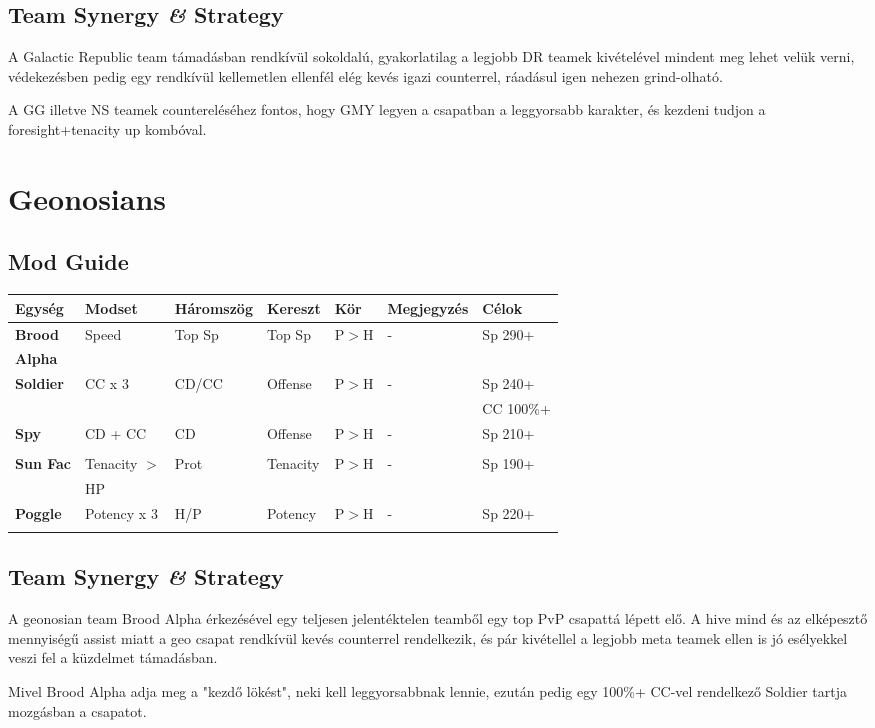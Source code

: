 \documentclass[11pt]{report}
\begin{document}
\section{Team Synergy \textit{\&} Strategy}
A Galactic Republic team támadásban rendkívül sokoldalú, gyakorlatilag a legjobb DR teamek kivételével mindent meg lehet velük verni, védekezésben pedig egy rendkívül kellemetlen ellenfél elég kevés igazi counterrel, ráadásul igen nehezen grind-olható.\par
A GG illetve NS teamek countereléséhez fontos, hogy GMY legyen a csapatban a leggyorsabb karakter, és kezdeni tudjon a foresight+tenacity up kombóval.


\chapter{Geonosians}
\section{Mod Guide}
\begin{center}
    \begin{tabular}{|l | l | l | l | l | l | l |}
        \hline
        Egység & Modset & Háromszög & Kereszt & Kör & Megjegyzés & Célok\\ \hline
        \textbf{Brood} & Speed & Top Sp & Top Sp & P$>$H & - & Sp 290+\\
        \textbf{Alpha} &  &  &  &  &  & \\ \hline
        \textbf{Soldier} & CC x 3 & CD/CC & Offense & P$>$H & - & Sp 240+\\
        &  &  &  &  &  & CC 100\%+\\ \hline
        \textbf{Spy} & CD + CC & CD & Offense & P$>$H & - & Sp 210+\\
        &  &  &  &  &  & \\ \hline
        \textbf{Sun Fac} & Tenacity $>$ & Prot & Tenacity & P$>$H & - & Sp 190+\\
        & HP &  &  &  &  & \\ \hline
        \textbf{Poggle} & Potency x 3 & H/P & Potency & P$>$H & - & Sp 220+\\
        &  &  &  &  &  & \\ \hline
    \end{tabular}
\end{center}
\section{Team Synergy \textit{\&} Strategy}
A geonosian team Brood Alpha érkezésével egy teljesen jelentéktelen teamből egy top PvP csapattá lépett elő. A hive mind és az elképesztő mennyiségű assist miatt a geo csapat rendkívül kevés counterrel rendelkezik, és pár kivétellel a legjobb meta teamek ellen is jó esélyekkel veszi fel a küzdelmet támadásban.\par
Mivel Brood Alpha adja meg a "kezdő lökést", neki kell leggyorsabbnak lennie, ezután pedig egy 100\%+ CC-vel rendelkező Soldier tartja mozgásban a csapatot.
\end{document}
